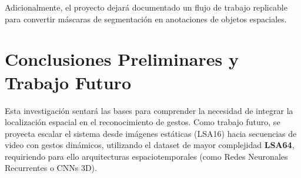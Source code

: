 \documentclass[a4paper,12pt]{article}
\begin{document}
Adicionalmente, el proyecto dejará documentado un flujo de trabajo replicable para convertir máscaras de segmentación en anotaciones de objetos espaciales.

\section{Conclusiones Preliminares y Trabajo Futuro}

Esta investigación sentará las bases para comprender la necesidad de integrar la localización espacial en el reconocimiento de gestos. Como trabajo futuro, se proyecta escalar el sistema desde imágenes estáticas (LSA16) hacia secuencias de video con gestos dinámicos, utilizando el dataset de mayor complejidad \textbf{LSA64}, requiriendo para ello arquitecturas espaciotemporales (como Redes Neuronales Recurrentes o CNNs 3D).
\end{document}
